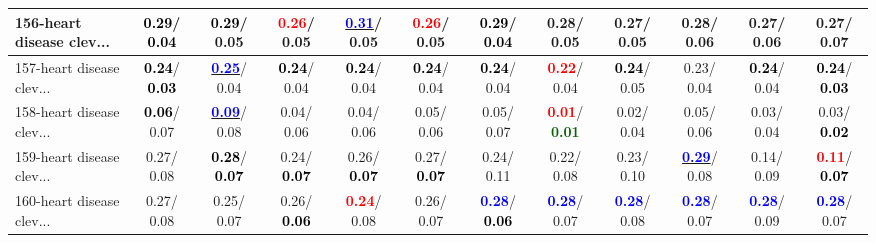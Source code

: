 \begin{table}[h]
\begin{center}
{\begin{tabular}{lc|c|c|c|c|c|c|c|c|c|c}
156-heart disease clev... & \textcolor{black}{\textbf{  0.29}}/\textcolor{black}{\textbf{  0.04}} & \textcolor{black}{\textbf{  0.29}}/  0.05 & \textcolor{red}{\textbf{  0.26}}/  0.05 & \underline{\textcolor{blue}{\textbf{  0.31}}}/  0.05 & \textcolor{red}{\textbf{  0.26}}/  0.05 & \textcolor{black}{\textbf{  0.29}}/\textcolor{black}{\textbf{  0.04}} &   0.28/  0.05 &   0.27/  0.05 &   0.28/  0.06 &   0.27/  0.06 &   0.27/  0.07 \\ \hline
157-heart disease clev... & \textcolor{black}{\textbf{  0.24}}/\textcolor{black}{\textbf{  0.03}} & \underline{\textcolor{blue}{\textbf{  0.25}}}/  0.04 & \textcolor{black}{\textbf{  0.24}}/  0.04 & \textcolor{black}{\textbf{  0.24}}/  0.04 & \textcolor{black}{\textbf{  0.24}}/  0.04 & \textcolor{black}{\textbf{  0.24}}/  0.04 & \textcolor{red}{\textbf{  0.22}}/  0.04 & \textcolor{black}{\textbf{  0.24}}/  0.05 &   0.23/  0.04 & \textcolor{black}{\textbf{  0.24}}/  0.04 & \textcolor{black}{\textbf{  0.24}}/\textcolor{black}{\textbf{  0.03}} \\
158-heart disease clev... & \textcolor{black}{\textbf{  0.06}}/  0.07 & \underline{\textcolor{blue}{\textbf{  0.09}}}/  0.08 &   0.04/  0.06 &   0.04/  0.06 &   0.05/  0.06 &   0.05/  0.07 & \textcolor{red}{\textbf{  0.01}}/\textcolor{darkgreen}{\textbf{  0.01}} &   0.02/  0.04 &   0.05/  0.06 &   0.03/  0.04 &   0.03/\textcolor{black}{\textbf{  0.02}} \\
159-heart disease clev... &   0.27/  0.08 & \textcolor{black}{\textbf{  0.28}}/\textcolor{black}{\textbf{  0.07}} &   0.24/\textcolor{black}{\textbf{  0.07}} &   0.26/\textcolor{black}{\textbf{  0.07}} &   0.27/\textcolor{black}{\textbf{  0.07}} &   0.24/  0.11 &   0.22/  0.08 &   0.23/  0.10 & \underline{\textcolor{blue}{\textbf{  0.29}}}/  0.08 &   0.14/  0.09 & \textcolor{red}{\textbf{  0.11}}/\textcolor{black}{\textbf{  0.07}} \\
160-heart disease clev... &   0.27/  0.08 &   0.25/  0.07 &   0.26/\textcolor{black}{\textbf{  0.06}} & \textcolor{red}{\textbf{  0.24}}/  0.08 &   0.26/  0.07 & \textcolor{blue}{\textbf{  0.28}}/\textcolor{black}{\textbf{  0.06}} & \textcolor{blue}{\textbf{  0.28}}/  0.07 & \textcolor{blue}{\textbf{  0.28}}/  0.08 & \textcolor{blue}{\textbf{  0.28}}/  0.07 & \textcolor{blue}{\textbf{  0.28}}/  0.09 & \textcolor{blue}{\textbf{  0.28}}/  0.07 \\\end{tabular}}\label{stratsALCKappa4AllReduxa}
\end{center}
\end{table}
